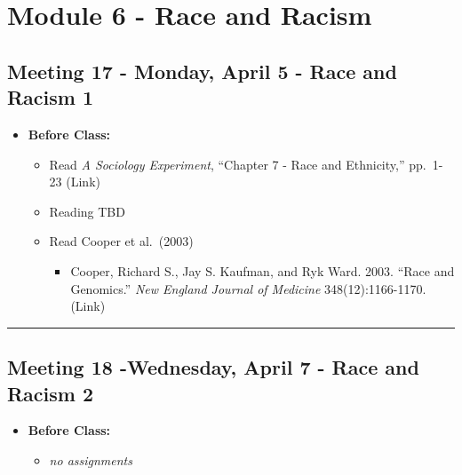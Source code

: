 \documentclass[
]{book}
\providecommand{\tightlist}{%
  \setlength{\itemsep}{0pt}\setlength{\parskip}{0pt}}
\begin{document}
\newpage

\hypertarget{module-6---race-and-racism}{%
\section{Module 6 - Race and Racism}\label{module-6---race-and-racism}}

\hypertarget{meeting-17---monday-april-5---race-and-racism-1}{%
\subsection*{Meeting 17 - Monday, April 5 - Race and Racism 1}\label{meeting-17---monday-april-5---race-and-racism-1}}

\begin{itemize}
\tightlist
\item
  \textbf{Before Class:}

  \begin{itemize}
  \tightlist
  \item
    Read \emph{A Sociology Experiment}, ``Chapter 7 - Race and Ethnicity,'' pp.~1-23 (Link)
  \item
    Reading TBD
  \item
    Read Cooper et al.~(2003)

    \begin{itemize}
    \tightlist
    \item
      Cooper, Richard S., Jay S. Kaufman, and Ryk Ward. 2003. ``Race and Genomics.'' \emph{New England Journal of Medicine} 348(12):1166-1170. (Link)
    \end{itemize}
  \end{itemize}
\end{itemize}

\begin{center}\rule{0.5\linewidth}{0.5pt}\end{center}

\hypertarget{meeting-18--wednesday-april-7---race-and-racism-2}{%
\subsection*{Meeting 18 -Wednesday, April 7 - Race and Racism 2}\label{meeting-18--wednesday-april-7---race-and-racism-2}}

\begin{itemize}
\tightlist
\item
  \textbf{Before Class:}

  \begin{itemize}
  \tightlist
  \item
    \emph{no assignments}
  \end{itemize}
\end{itemize}
\end{document}

